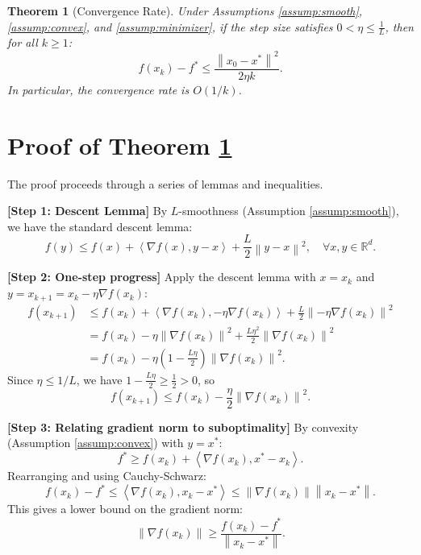 \documentclass{article}
\newtheorem{theorem}{Theorem}
\newcommand{\R}{\mathbb{R}}
\newcommand{\norm}[1]{\left\| #1 \right\|}
\newcommand{\inner}[1]{\left\langle #1 \right\rangle}
\newcommand{\step}[1]{\noindent\textbf{[Step #1]}}
\begin{document}
\begin{theorem}[Convergence Rate] \label{thm:convergence}
    Under Assumptions \ref{assump:smooth}, \ref{assump:convex}, and \ref{assump:minimizer}, if the step size satisfies $0 < \eta \le \frac{1}{L}$, then for all $k \ge 1$:
    \begin{equation}
        f(x_k) - f^* \le \frac{\norm{x_0 - x^*}^2}{2\eta k}.
    \end{equation}
    In particular, the convergence rate is $O(1/k)$.
\end{theorem}

\section{Proof of Theorem \ref{thm:convergence}}

The proof proceeds through a series of lemmas and inequalities.

\step{1: Descent Lemma}
By $L$-smoothness (Assumption \ref{assump:smooth}), we have the standard descent lemma:
\begin{equation}
    f(y) \le f(x) + \inner{\nabla f(x), y - x} + \frac{L}{2} \norm{y - x}^2, \quad \forall x, y \in \R^d.
\end{equation}

\step{2: One-step progress}
Apply the descent lemma with $x = x_k$ and $y = x_{k+1} = x_k - \eta \nabla f(x_k)$:
\begin{align}
    f(x_{k+1}) &\le f(x_k) + \inner{\nabla f(x_k), -\eta \nabla f(x_k)} + \frac{L}{2} \norm{-\eta \nabla f(x_k)}^2 \\
    &= f(x_k) - \eta \norm{\nabla f(x_k)}^2 + \frac{L\eta^2}{2} \norm{\nabla f(x_k)}^2 \\
    &= f(x_k) - \eta\left(1 - \frac{L\eta}{2}\right) \norm{\nabla f(x_k)}^2.
\end{align}
Since $\eta \le 1/L$, we have $1 - \frac{L\eta}{2} \ge \frac{1}{2} > 0$, so
\begin{equation} \label{eq:descent}
    f(x_{k+1}) \le f(x_k) - \frac{\eta}{2} \norm{\nabla f(x_k)}^2.
\end{equation}

\step{3: Relating gradient norm to suboptimality}
By convexity (Assumption \ref{assump:convex}) with $y = x^*$:
\begin{equation}
    f^* \ge f(x_k) + \inner{\nabla f(x_k), x^* - x_k}.
\end{equation}
Rearranging and using Cauchy-Schwarz:
\begin{equation}
    f(x_k) - f^* \le \inner{\nabla f(x_k), x_k - x^*} \le \norm{\nabla f(x_k)} \norm{x_k - x^*}.
\end{equation}
This gives a lower bound on the gradient norm:
\begin{equation} \label{eq:grad_lower}
    \norm{\nabla f(x_k)} \ge \frac{f(x_k) - f^*}{\norm{x_k - x^*}}.
\end{equation}
\end{document}
